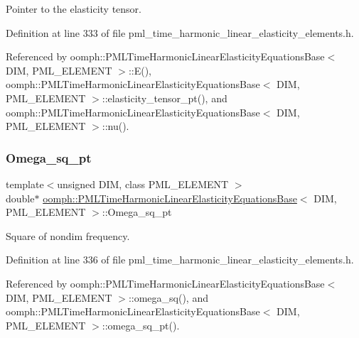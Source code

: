 Pointer to the elasticity tensor. 



Definition at line 333 of file pml\+\_\+time\+\_\+harmonic\+\_\+linear\+\_\+elasticity\+\_\+elements.\+h.



Referenced by oomph\+::\+P\+M\+L\+Time\+Harmonic\+Linear\+Elasticity\+Equations\+Base$<$ D\+I\+M, P\+M\+L\+\_\+\+E\+L\+E\+M\+E\+N\+T $>$\+::\+E(), oomph\+::\+P\+M\+L\+Time\+Harmonic\+Linear\+Elasticity\+Equations\+Base$<$ D\+I\+M, P\+M\+L\+\_\+\+E\+L\+E\+M\+E\+N\+T $>$\+::elasticity\+\_\+tensor\+\_\+pt(), and oomph\+::\+P\+M\+L\+Time\+Harmonic\+Linear\+Elasticity\+Equations\+Base$<$ D\+I\+M, P\+M\+L\+\_\+\+E\+L\+E\+M\+E\+N\+T $>$\+::nu().

\mbox{\label{classoomph_1_1PMLTimeHarmonicLinearElasticityEquationsBase_a485940b2f07bef035eee53d5b1a5e70f}} 
\subsubsection{\texorpdfstring{Omega\+\_\+sq\+\_\+pt}{Omega\_sq\_pt}}
{\footnotesize\ttfamily template$<$unsigned D\+IM, class P\+M\+L\+\_\+\+E\+L\+E\+M\+E\+NT $>$ \\
double$\ast$ \hyperlink{classoomph_1_1PMLTimeHarmonicLinearElasticityEquationsBase}{oomph\+::\+P\+M\+L\+Time\+Harmonic\+Linear\+Elasticity\+Equations\+Base}$<$ D\+IM, P\+M\+L\+\_\+\+E\+L\+E\+M\+E\+NT $>$\+::Omega\+\_\+sq\+\_\+pt\hspace{0.3cm}{\ttfamily [protected]}}



Square of nondim frequency. 



Definition at line 336 of file pml\+\_\+time\+\_\+harmonic\+\_\+linear\+\_\+elasticity\+\_\+elements.\+h.



Referenced by oomph\+::\+P\+M\+L\+Time\+Harmonic\+Linear\+Elasticity\+Equations\+Base$<$ D\+I\+M, P\+M\+L\+\_\+\+E\+L\+E\+M\+E\+N\+T $>$\+::omega\+\_\+sq(), and oomph\+::\+P\+M\+L\+Time\+Harmonic\+Linear\+Elasticity\+Equations\+Base$<$ D\+I\+M, P\+M\+L\+\_\+\+E\+L\+E\+M\+E\+N\+T $>$\+::omega\+\_\+sq\+\_\+pt().



